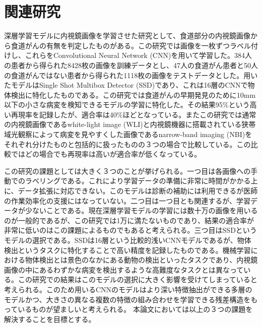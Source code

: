 \section{関連研究}
深層学習モデルに内視鏡画像を学習させた研究として、食道部分の内視鏡画像から食道がんの有無を判定したものがある。この研究では画像を一枚ずつラベル付けし、これらをConvolutional Neural Network (CNN)を用いて学習した。384人の患者から得られた8428枚の画像を訓練データとし、47人の食道がん患者と50人の食道がんではない患者から得られた1118枚の画像をテストデータとした。用いたモデルはSingle Shot Multibox Detector (SSD)であり、これは16層のCNNで物体検出に特化したものである。この研究では食道がんの早期発見のために10mm以下の小さな病変を検知できるモデルの学習に特化した。その結果95\%という高い再現率を記録したが、適合率は40\%ほどとなっている。またこの研究では通常の内視鏡画像であるwhite-light image (WLI)と内視鏡機器に搭載されている狭帯域光観察によって病変を見やすくした画像であるnarrow-band imaging (NBI)をそれぞれ分けたものと包括的に扱ったものの３つの場合で比較している。この比較ではどの場合でも再現率は高いが適合率が低くなっている。

この研究の課題としては大きく３つのことが挙げられる。一つ目は各画像への手動でのラベリングである。これにより学習データの準備に非常に時間がかかる上に、データ拡張に対応できない。このモデルは診断の補助には利用できるが医師の作業効率化の支援にはなっていない。二つ目は一つ目とも関連するが、学習データが少ないことである。現在深層学習モデルの学習には数十万の画像を用いるのが一般的であるが、この研究では1万に満たないものであり、結果の適合率が非常に低いのはこの課題によるものでもあると考えられる。三つ目はSSDというモデルの選択である。SSDは16層という比較的浅いCNNモデルであるが、物体検出というタスクに特化することで高い精度を記録したものである。機械学習における物体検出とは景色のなかにある動物の検出といったタスクであり、内視鏡画像の中にあるわずかな病変を検出するような高難度なタスクとは異なっている。この研究での結果はこのモデルの選択に大きく影響を受けてしまっていると考えられる。このため用いるCNNのモデルはより深い特徴抽出ができる多層のモデルかつ、大きさの異なる複数の特徴の組み合わせを学習できる残差構造をもっているものが望ましいと考えられる。
本論文においては以上の３つの課題を解決することを目標とする。
